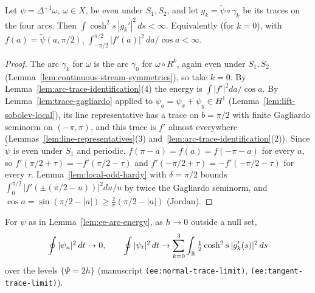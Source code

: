 \begin{lemma}
\label{lem:ee-arc-energy}
\leanok
Let $\psi=\Delta^{-1}\omega$, $\omega\in X$, be even under $S_1,S_2$, and let
$g_k=\tilde\psi\circ\gamma_k$ be its traces on the four arcs. Then
$\int\cosh^2s\,|g_k'|^2\,ds<\infty$. Equivalently (for $k=0$), with $f(a)=\tilde\psi(a,\pi/2)$,
$\int_{-\pi/2}^{\pi/2}|f'(a)|^2\,da/\cos a<\infty$.
\end{lemma}

\begin{proof}
\leanok
The arc $\gamma_k$ for $\omega$ is the arc $\gamma_0$ for $\omega\circ R^k$, again even under $S_1,S_2$
(Lemma~\ref{lem:continuous-stream-symmetries}), so take $k=0$. By
Lemma~\ref{lem:arc-trace-identification}(4) the energy is $\int|f'|^2da/\cos a$. By
Lemma~\ref{lem:trace-gagliardo} applied to $\psi_a=\psi_x+\psi_y\in H^1$
(Lemma~\ref{lem:lift-sobolev-local}), its line representative has a trace on $b=\pi/2$ with finite
Gagliardo seminorm on $(-\pi,\pi)$, and this trace is $f'$ almost everywhere
(Lemmas~\ref{lem:line-representatives}(3) and~\ref{lem:arc-trace-identification}(2)). Since
$\tilde\psi$ is even under $S_1$ and periodic, $f(\pi-a)=f(a)=f(-\pi-a)$ for every $a$, so
$f'(\pi/2+\tau)=-f'(\pi/2-\tau)$ and $f'(-\pi/2+\tau)=-f'(-\pi/2-\tau)$ for every $\tau$.
Lemma~\ref{lem:local-odd-hardy} with $\delta=\pi/2$ bounds $\int_0^{\pi/2}|f'(\pm(\pi/2-u))|^2du/u$ by
twice the Gagliardo seminorm, and $\cos a=\sin(\pi/2-|a|)\ge\frac2\pi(\pi/2-|a|)$ (Jordan).
\end{proof}

\begin{lemma}
\label{lem:ee-level-traces}
\leanok
For $\psi$ as in Lemma~\ref{lem:ee-arc-energy}, as $h\to0$ outside a null set,
\[
  \oint|\psi_n|^2\,dt\to0,\qquad
  \oint|\psi_t|^2\,dt\to\sum_{k=0}^{3}\int_{\mathbb{R}}\tfrac12\cosh^2s\,|g_k'(s)|^2\,ds
\]
over the levels $\{\Psi=2h\}$ (manuscript \texttt{(ee:normal-trace-limit)},
\texttt{(ee:tangent-trace-limit)}).
\end{lemma}

